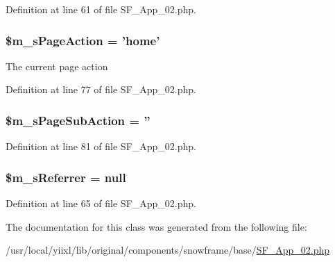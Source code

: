 Definition at line 61 of file SF\_\-App\_\-02.php.

\hypertarget{classSF__App__02_a82cc1f3844569fa451cac5abc03b1a4d}{
\subsubsection[{\$m\_\-sPageAction}]{\setlength{\rightskip}{0pt plus 5cm}\$m\_\-sPageAction = 'home'}}
\label{classSF__App__02_a82cc1f3844569fa451cac5abc03b1a4d}
The current page action 

Definition at line 77 of file SF\_\-App\_\-02.php.

\hypertarget{classSF__App__02_a980e6fd9e83172281b1e6dac50f16e9c}{
\subsubsection[{\$m\_\-sPageSubAction}]{\setlength{\rightskip}{0pt plus 5cm}\$m\_\-sPageSubAction = ''}}
\label{classSF__App__02_a980e6fd9e83172281b1e6dac50f16e9c}


Definition at line 81 of file SF\_\-App\_\-02.php.

\hypertarget{classSF__App__02_a251ed856d45aa28d717a012291b71d26}{
\subsubsection[{\$m\_\-sReferrer}]{\setlength{\rightskip}{0pt plus 5cm}\$m\_\-sReferrer = null}}
\label{classSF__App__02_a251ed856d45aa28d717a012291b71d26}


Definition at line 65 of file SF\_\-App\_\-02.php.



The documentation for this class was generated from the following file:\begin{DoxyCompactItemize}
\item 
/usr/local/yiixl/lib/original/components/snowframe/base/\hyperlink{SF__App__02_8php}{SF\_\-App\_\-02.php}\end{DoxyCompactItemize}

